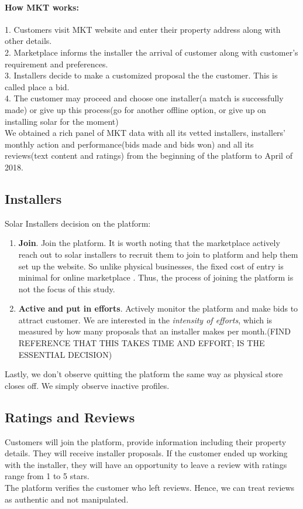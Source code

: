 \documentclass[msom,blindrev]{informs3}
\begin{document}
\paragraph{How MKT works:}
1. Customers visit MKT website and enter their property address along with other details.  \\
2. Marketplace informs the installer the arrival of customer along with customer's requirement and preferences. \\
3. Installers decide to make a customized proposal the the customer. This is called place a bid. \\
4. The customer may proceed and choose one installer(a match is successfully made) or give up this process(go for another offline option, or give up on installing solar for the moment) \\ 
We obtained a rich panel of MKT data with all its vetted installers, installers' monthly action and performance(bids made and bids won) and all its reviews(text content and ratings) from the beginning of the platform to April of 2018. 

\subsection{Installers}
Solar Installers decision on the platform: 

\begin{enumerate}
\item  \textbf{Join}. Join the platform. It is worth noting that the marketplace actively reach out to solar installers to recruit them to join to platform and help them set up the website. So unlike physical businesses, the fixed cost of entry is minimal for online marketplace \citep{haddad2015consumer}. Thus, the process of joining the platform is not the focus of this study. \\
\item  \textbf{Active and put in efforts}. Actively monitor the platform and make bids to attract customer. We are interested in the\textit{ intensity of efforts}, which is measured by how many proposals that an installer makes per month.(FIND REFERENCE THAT THIS TAKES TIME AND EFFORT; IS THE ESSENTIAL DECISION)\\
\end{enumerate}

Lastly, we don't observe quitting the platform the same way as physical store closes off. We simply observe inactive profiles. 


\subsection{Ratings and Reviews}
Customers will join the platform, provide information including their property details. They will receive installer proposals. If the customer ended up working with the installer, they will have an opportunity to leave a review with ratings range from 1 to 5 stars. \\
The platform verifies the customer who left reviews. Hence, we can treat reviews as authentic and not manipulated. 
\end{document}
